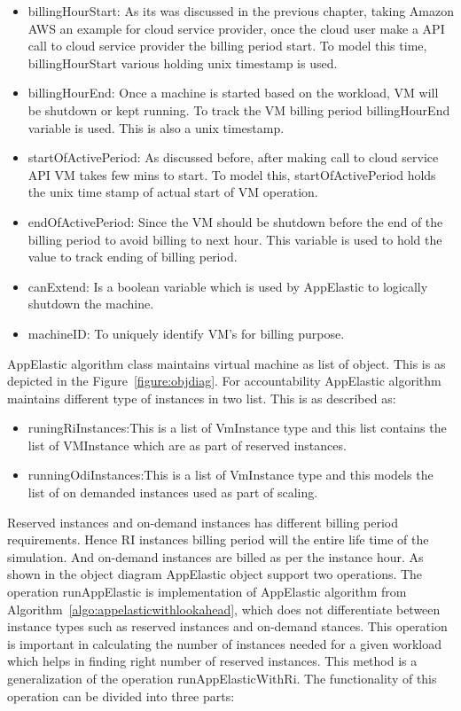 \begin{itemize}
  \item billingHourStart: As its was discussed in the previous chapter, taking Amazon AWS an example for cloud service provider, once the cloud user make a API call to cloud service provider the billing period start. To model this time, billingHourStart various holding unix timestamp is used.
  \item billingHourEnd: Once a machine is started based on the workload, VM will be shutdown or kept running. To track the VM billing period billingHourEnd variable is used. This is also a unix timestamp.
  \item startOfActivePeriod: As discussed before, after making call to cloud service API VM takes few mins to start. To model this,  startOfActivePeriod holds the unix time stamp of actual start of VM operation.
  \item endOfActivePeriod: Since the VM should be shutdown before the end of the billing period to avoid billing to next hour. This variable is used to hold the value to track ending of billing period.
  \item canExtend: Is a boolean variable which is used by AppElastic to logically shutdown the machine.
  \item machineID: To uniquely identify VM's for billing purpose.
\end{itemize}
AppElastic algorithm class maintains virtual machine as list of object. This is as depicted in the Figure~\ref{figure:objdiag}. For accountability AppElastic algorithm maintains different type of instances in two list. This is as described as:
\begin{itemize}
  \item runingRiInstances:This is a list of VmInstance type and this list contains the list of VMInstance which are as part of reserved instances.
  \item runningOdiInstances:This is a list of VmInstance type and this models the list of on demanded instances used as part of scaling.
\end{itemize}
Reserved instances and on-demand instances has different billing period requirements. Hence RI instances billing period will the entire life time of the simulation. And on-demand instances are billed as per the instance hour. As shown in the object diagram AppElastic object support two operations. The operation runAppElastic is implementation of AppElastic algorithm from Algorithm~\ref{algo:appelasticwithlookahead}, which does not differentiate between instance types such as reserved instances and on-demand stances. This operation is important in calculating the number of instances needed for a given workload which helps in finding right number of reserved instances.  This method is a generalization of the operation runAppElasticWithRi. The functionality of this operation can be divided into three parts:
